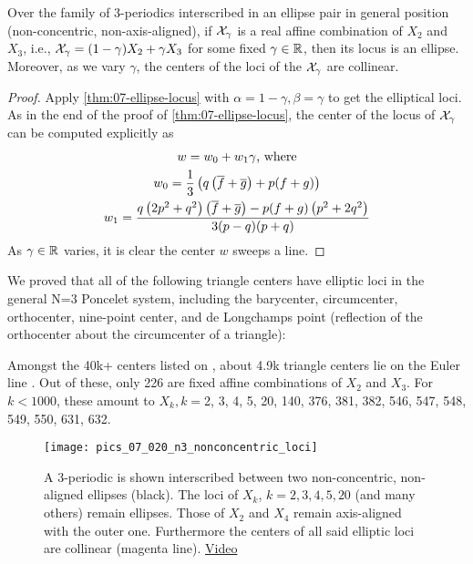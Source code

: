 \begin{corollary}
Over the family of 3-periodics interscribed in an ellipse pair in general position (non-concentric, non-axis-aligned),
if $\mathcal{X}_\gamma$ is a real affine combination of $X_2$ and $X_3$, i.e., $\mathcal{X}_\gamma=(1-\gamma) X_2+\gamma X_3$ for some fixed $\gamma\in\mathbb{R}$, then its locus is an ellipse. Moreover, as we vary $\gamma$, the centers of the loci of the $\mathcal{X}_\gamma$ are collinear.
\end{corollary}

\begin{proof}
Apply   \cref{thm:07-ellipse-locus} with $\alpha=1-\gamma, \beta=\gamma$ to get the elliptical loci. As in the end of the proof of  \cref{thm:07-ellipse-locus}, the center of the locus of $\mathcal{X}_\gamma$ can be computed explicitly as 
\begin{gather*}
    w=w_0+w_1 \gamma \text{, where}\\
    w_0=\frac{1}{3} \left(q \left(\overline{f}+\overline{g}\right)+p (f+g)\right)\\
    w_1=\frac{q \left(2 p^2+q^2\right) \left(\overline{f}+\overline{g}\right)-p (f+g) \left(p^2+2 q^2\right)}{3 (p-q) (p+q)}
\end{gather*}
As $\gamma\in\mathbb{R}$ varies, it is clear the center $w$ sweeps a line.
\end{proof}

We proved that all of the following triangle centers have elliptic loci in the general N=3 Poncelet system, including the barycenter, circumcenter, orthocenter, nine-point center, and de Longchamps point (reflection of the orthocenter  about the circumcenter of a triangle):

\begin{observation}
Amongst the 40k+ centers listed on \cite{etc}, about 4.9k triangle centers lie on the Euler line \cite{etc-central-lines}. Out of these, only 226 are fixed affine combinations of $X_2$ and $X_3$. For $k<1000$, these amount to $X_k,k=${\small 2, 3, 4, 5, 20, 140, 376, 381, 382, 546, 547, 548, 549, 550, 631, 
632}.
\label{obs:affine-euler-line}
\end{observation}

\begin{figure}
     \centering
     \texttt{[image: pics\_07\_020\_n3\_nonconcentric\_loci]}
     \caption{A 3-periodic is shown interscribed between two non-concentric, non-aligned ellipses (black). The loci of $X_k$, $k=2,3,4,5,20$ (and many others) remain ellipses. Those of $X_2$ and $X_4$ remain axis-aligned with the outer one. Furthermore the centers of all said elliptic loci are collinear (magenta line). \href{https://youtu.be/p1medAei_As}{Video}}
     \label{fig:07-nonconcentric-xns}
 \end{figure}
 
